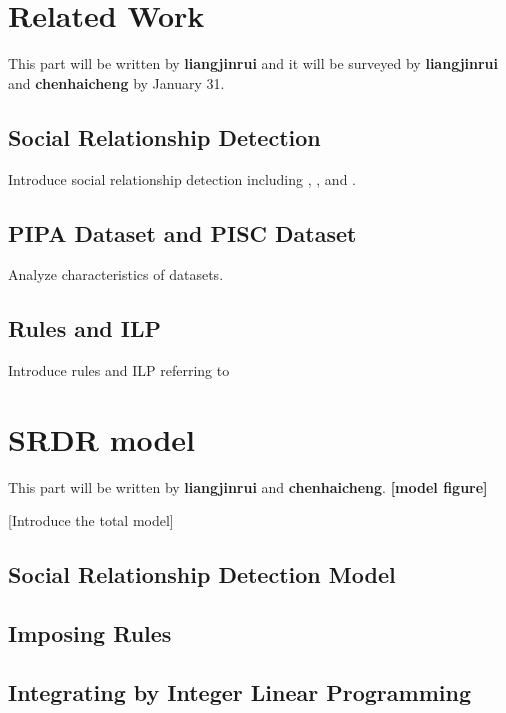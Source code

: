 \documentclass{article}
\begin{document}
\section{Related Work}

This part will be written by {\bf liangjinrui} and it will be surveyed by {\bf liangjinrui} and {\bf chenhaicheng} by January 31.

\subsection{Social Relationship Detection}
Introduce social relationship detection including \cite{DBLP:conf/aaai/GuoWWWG18}, \cite{DBLP:conf/iccv/LiWZK17}, \cite{DBLP:conf/ijcai/WangWG15} and \cite{DBLP:conf/ijcai/WangCRYCL18}.


\subsection{PIPA Dataset and PISC Dataset}

Analyze characteristics of datasets.
 


\subsection{Rules and ILP}

Introduce rules and ILP referring to \cite{DBLP:conf/ijcai/WangWG15}



\section{SRDR model}
This part will be written by {\bf liangjinrui} and {\bf chenhaicheng}.
{\bf [model figure]}

[Introduce the total model]

\subsection{Social Relationship Detection Model}
\subsection{Imposing Rules}
\subsection{Integrating by Integer Linear Programming}
\end{document}
